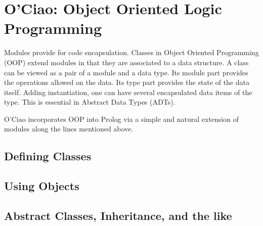 
\section{O'Ciao: Object Oriented Logic Programming}

Modules provide for code encapsulation. Classes in Object Oriented
Programming (OOP) extend modules in that they are associated to a data
structure. A class can be viewed as a pair of a module and a data
type. Its module part provides the operations allowed on the data. Its
type part provides the state of the data itself. Adding instantiation,
one can have several encapsulated data items of the type. This is
essential in Abstract Data Types (ADTs).

O'Ciao incorporates OOP into Prolog via a simple and natural extension
of modules along the lines mentioned above.

\subsection{Defining Classes}

\subsection{Using Objects}


\subsection{Abstract Classes, Inheritance, and the like}
